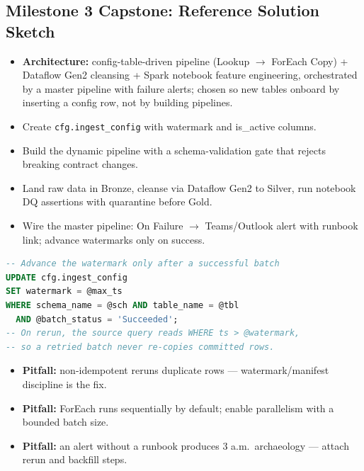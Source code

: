 \documentclass[11pt, a4paper]{article}
\begin{document}
\subsection*{Milestone 3 Capstone: Reference Solution Sketch}
\begin{itemize}[label=-, itemsep=0pt]
    \item \textbf{Architecture:} config-table-driven pipeline (Lookup $\rightarrow$ ForEach Copy) + Dataflow Gen2 cleansing + Spark notebook feature engineering, orchestrated by a master pipeline with failure alerts; chosen so new tables onboard by inserting a config row, not by building pipelines.
    \item Create \texttt{cfg.ingest\_config} with watermark and is\_active columns.
    \item Build the dynamic pipeline with a schema-validation gate that rejects breaking contract changes.
    \item Land raw data in Bronze, cleanse via Dataflow Gen2 to Silver, run notebook DQ assertions with quarantine before Gold.
    \item Wire the master pipeline: On Failure $\rightarrow$ Teams/Outlook alert with runbook link; advance watermarks only on success.
\end{itemize}
\begin{lstlisting}[language=SQL]
-- Advance the watermark only after a successful batch
UPDATE cfg.ingest_config
SET watermark = @max_ts
WHERE schema_name = @sch AND table_name = @tbl
  AND @batch_status = 'Succeeded';
-- On rerun, the source query reads WHERE ts > @watermark,
-- so a retried batch never re-copies committed rows.
\end{lstlisting}
\begin{itemize}[label=-, itemsep=0pt]
    \item \textbf{Pitfall:} non-idempotent reruns duplicate rows --- watermark/manifest discipline is the fix.
    \item \textbf{Pitfall:} ForEach runs sequentially by default; enable parallelism with a bounded batch size.
    \item \textbf{Pitfall:} an alert without a runbook produces 3 a.m.\ archaeology --- attach rerun and backfill steps.
\end{itemize}
\end{document}
